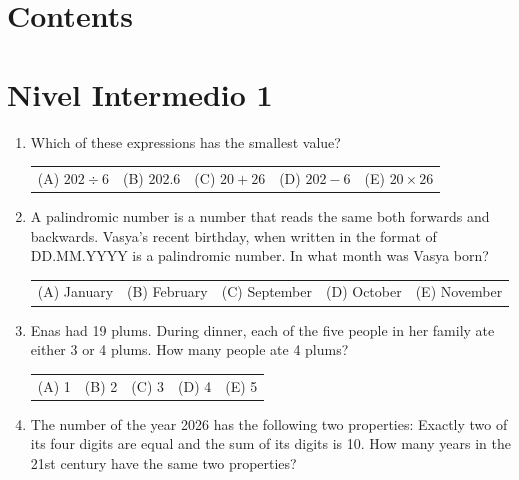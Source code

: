 
\usetikzlibrary{calc}


	
	
	\section*{Contents}
	\tableofcontents
	
	\section*{Nivel Intermedio 1}
	
	
	\begin{enumerate}
		\item Which of these expressions has the smallest value?
		
		\begin{center}
			\begin{tabular}{ccccc}
				(A) $202 \div 6$ & (B) $202.6$ & (C) $20+26$ & (D) $202-6$ & (E) $20\times 26$
			\end{tabular}
		\end{center}
		
		\item A palindromic number is a number that reads the same both forwards and backwards. Vasya's recent birthday, when written in the format of DD.MM.YYYY is a palindromic number. In what month was Vasya born?
		
		\begin{center}
			\begin{tabular}{ccccc}
				(A) January & (B) February & (C) September & (D) October & (E) November
			\end{tabular}
		\end{center}
		
		\item Enas had 19 plums. During dinner, each of the five people in her family ate either 3 or 4 plums. How many people ate 4 plums?
		
		\begin{center}
			\begin{tabular}{ccccc}
				(A) 1 & (B) 2 & (C) 3 & (D) 4 & (E) 5
			\end{tabular}
		\end{center}
		
		\item The number of the year 2026 has the following two properties: Exactly two of its four digits are equal and the sum of its digits is 10. How many years in the 21st century have the same two properties?
		

\end{enumerate}
